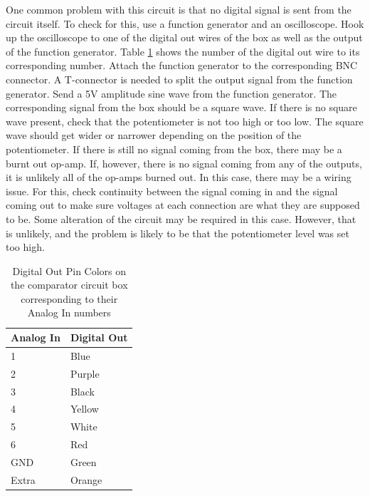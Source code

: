 One common problem with this circuit is that no digital signal is sent from the circuit itself. To check for this, use a function generator and an oscilloscope. Hook up the oscilloscope to one of the digital out wires of the box as well as the output of the function generator. Table \ref{Table:pins} shows the number of the digital out wire to its corresponding number. Attach the function generator to the corresponding BNC connector. A T-connector is needed to split the output signal from the function generator. Send a 5V amplitude sine wave from the function generator. The corresponding signal from the box should be a square wave. If there is no square wave present, check that the potentiometer is not too high or too low. The square wave should get wider or narrower depending on the position of the potentiometer. If there is still no signal coming from the box, there may be a burnt out op-amp. If, however, there is no signal coming from any of the outputs, it is unlikely all of the op-amps burned out. In this case, there may be a wiring issue. For this, check continuity between the signal coming in and the signal coming out to make sure voltages at each connection are what they are supposed to be. Some alteration of the circuit may be required in this case. However, that is unlikely, and the problem is likely to be that the potentiometer level was set too high.

\begin{table}[]
\centering
\caption[Digital Pin Out Colors]{Digital Out Pin Colors on the comparator circuit box corresponding to their Analog In numbers}
\label{Table:pins}
\begin{tabular}{l|l}

Analog In & Digital Out \\ \hline
1        & Blue       \\ 
2        & Purple     \\ 
3        & Black       \\ 
4        & Yellow       \\ 
5 		 & White		\\
6 		 & Red	      \\
GND      & Green	\\
Extra    & Orange	\\
\end{tabular}
\end{table}





